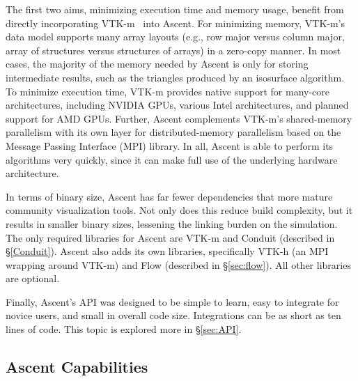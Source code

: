 \documentclass[graybox]{svmult}
\newcommand{\fix}[1]{\textcolor{red}{#1}} %
\begin{document}
The first two aims, minimizing execution time and memory usage, benefit from directly
incorporating VTK-m~\cite{Moreland:CGA2016} into Ascent.
%
For minimizing memory,
VTK-m's data model supports many array layouts (e.g., row major versus
column major, array of structures versus structures of arrays)
in a zero-copy manner.
%
In most cases, the majority of the memory needed by Ascent is only for
storing intermediate results, such as the triangles produced by an isosurface algorithm.
%
To minimize execution time,
VTK-m provides native support for many-core architectures,
including NVIDIA GPUs, various Intel architectures,
and planned support for AMD GPUs.
%
Further, Ascent complements VTK-m's shared-memory parallelism with
its own layer for distributed-memory parallelism based on the
Message Passing Interface (MPI) library.
%
In all, Ascent is able to perform its algorithms very quickly,
since it can make full use of the underlying hardware architecture.
%

In terms of binary size, Ascent has far
fewer dependencies that more mature community visualization tools.
%
Not only does this reduce build complexity, but it results in
smaller binary sizes, lessening the linking burden on the simulation.
%
The only required libraries for Ascent are VTK-m
and Conduit (described in \S\ref{Conduit}).
%
Ascent also adds its own libraries, specifically VTK-h (an MPI wrapping around
VTK-m) and Flow (described in \S\ref{sec:flow}).
%
All other libraries are optional.

Finally, Ascent's API was designed to be simple to learn,
easy to integrate for novice users, and small in overall code size.
%
Integrations can be as short as ten lines of code.
%
This topic is explored more in \S\ref{sec:API}.

\subsection{Ascent Capabilities}
\label{subsec:capabilities}
\end{document}
